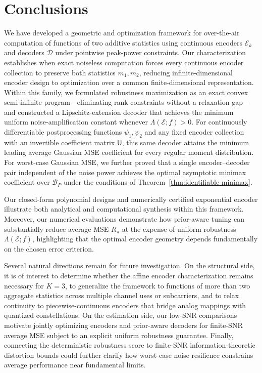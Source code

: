 \documentclass[journal,12pt,onecolumn,draftclsnofoot]{IEEEtran}
\newcommand{\enc}{\mathscr{E}}\newcommand{\dec}{\mathscr{D}}\newcommand{\R}{\mathbb R}\newcommand{\C}{\mathbb C}
\begin{document}




\section{Conclusions}\label{sec:boundaries}


We have developed a geometric and optimization framework for over-the-air computation of functions of two additive statistics using continuous encoders $\enc_k$ and decoders $\dec$ under pointwise peak-power constraints. Our characterization establishes when exact noiseless computation forces every continuous encoder collection to preserve both statistics $m_1,m_2$, reducing infinite-dimensional encoder design to optimization over a common finite-dimensional representation. Within this family, we formulated robustness maximization as an exact convex semi-infinite program—eliminating rank constraints without a relaxation gap—and constructed a Lipschitz-extension decoder that achieves the minimum uniform noise-amplification constant whenever $\Lambda(\enc;f)>0$. For continuously differentiable postprocessing functions $\psi_1,\psi_2$ and any fixed encoder collection with an invertible coefficient matrix $\mathsf U$, this same decoder attains the minimum leading average Gaussian MSE coefficient for every regular moment distribution. For worst-case Gaussian MSE, we further proved that a single encoder--decoder pair independent of the noise power achieves the optimal asymptotic minimax coefficient over $\mathcal B_P$ under the conditions of Theorem~\ref{thm:identifiable-minimax}.

Our closed-form polynomial designs and numerically certified exponential encoder illustrate both analytical and computational synthesis within this framework. Moreover, our numerical evaluations demonstrate how prior-aware tuning can substantially reduce average MSE $R_\pi$ at the expense of uniform robustness $\Lambda(\enc;f)$, highlighting that the optimal encoder geometry depends fundamentally on the chosen error criterion. 

Several natural directions remain for future investigation. On the structural side, it is of interest to determine whether the affine encoder characterization remains necessary for $K=3$, to generalize the framework to functions of more than two aggregate statistics across multiple channel uses or subcarriers, and to relax continuity to piecewise-continuous encoders that bridge analog mappings with quantized constellations. On the estimation side, our low-SNR comparisons motivate jointly optimizing encoders and prior-aware decoders for finite-SNR average MSE subject to an explicit uniform robustness guarantee. Finally, connecting the deterministic robustness score to finite-SNR information-theoretic distortion bounds could further clarify how worst-case noise resilience constrains average performance near fundamental limits.
\end{document}
